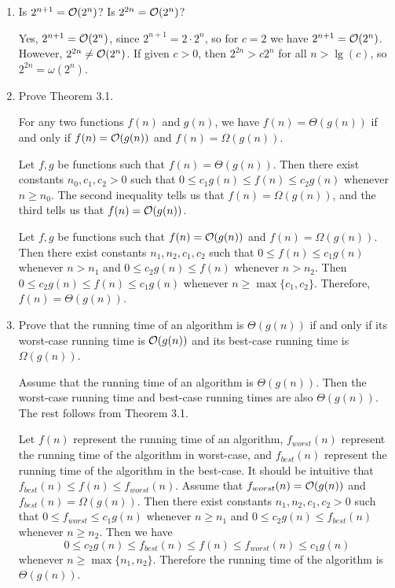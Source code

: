 \documentclass[Chapter03]{subfiles}
\begin{document}
\begin{enumerate}
		\item Is $2^{n + 1} = \mathcal{O}(2^n)$? Is $2^{2n} = \mathcal{O}(2^n)$?
		\begin{answer}
			Yes, $2^{n + 1} = \mathcal{O}(2^n)$, since $2^{n+1} = 2\cdot 2^n$, so for $c = 2$ we have $2^{n + 1} = \mathcal{O}(2^n)$. However, $2^{2n} \neq \mathcal{O}(2^n)$. If given $c > 0$, then $2^{2n} > c2^n$ for all $n > \lg(c)$, so $2^{2n} = \omega(2^n)$.
		\end{answer}

		\item Prove Theorem 3.1.
		\begin{theorem}[Theorem 3.1]
			For any two functions $f(n)$ and $g(n)$, we have $f(n) = \Theta(g(n))$ if and only if $f(n) = \mathcal{O}(g(n))$ and $f(n) = \Omega(g(n))$.
		\end{theorem}
		\begin{answer}
			\boxed{\implies} Let $f,g$ be functions such that $f(n) = \Theta(g(n))$. Then there exist constants $n_0,c_1,c_2 > 0$ such that $0 \leq c_1g(n) \leq f(n) \leq c_2g(n)$ whenever $n \geq n_0$. The second inequality tells us that $f(n) = \Omega(g(n))$, and the third tells us that $f(n) = \mathcal{O}(g(n))$.

			\boxed{\impliedby} Let $f,g$ be functions such that $f(n) = \mathcal{O}(g(n))$ and $f(n) = \Omega(g(n))$. Then there exist constants $n_1,n_2,c_1,c_2$ such that $0 \leq f(n) \leq c_1g(n)$ whenever $n > n_1$ and $0 \leq c_2g(n) \leq f(n)$ whenever $n > n_2$. Then $0 \leq c_2g(n) \leq f(n) \leq c_1g(n)$ whenever $n \geq \max\{c_1,c_2\}$. Therefore, $f(n) = \Theta(g(n))$.
		\end{answer}

		\item Prove that the running time of an algorithm is $\Theta(g(n))$ if and only if its worst-case running time is $\mathcal{O}(g(n))$ and its best-case running time is $\Omega(g(n))$.
		\begin{answer}
			\boxed{\implies} Assume that the running time of an algorithm is $\Theta(g(n))$. Then the worst-case running time and best-case running times are also $\Theta(g(n))$. The rest follows from Theorem 3.1.

			\boxed{\impliedby} Let $f(n)$ represent the running time of an algorithm, $f_{worst}(n)$ represent the running time of the algorithm in worst-case, and $f_{best}(n)$ represent the running time of the algorithm in the best-case. It should be intuitive that $f_{best}(n) \leq f(n) \leq f_{worst}(n)$. Assume that $f_{worst}(n) = \mathcal{O}(g(n))$ and $f_{best}(n) = \Omega(g(n))$. Then there exist constants $n_1,n_2,c_1,c_2 > 0$ such that $0 \leq f_{worst} \leq c_1g(n)$ whenever $n \geq n_1$ and $0 \leq c_2g(n) \leq f_{best}(n)$ whenever $n \geq n_2$. Then we have
			\[
				0 \leq c_2g(n) \leq f_{best}(n) \leq f(n) \leq f_{worst}(n) \leq c_1g(n)
			\]
			whenever $n \geq \max\{n_1,n_2\}$. Therefore the running time of the algorithm is $\Theta(g(n))$.
		\end{answer}


\end{enumerate}
\end{document}
